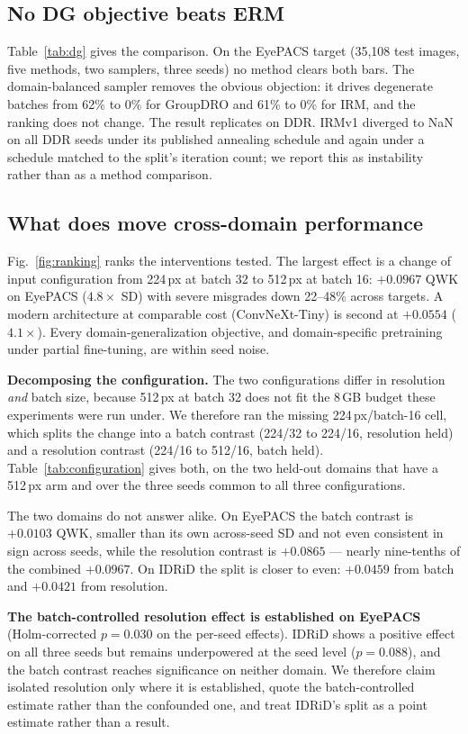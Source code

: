 \documentclass[journal]{IEEEtran}
\begin{document}
\subsection{No DG objective beats ERM}
Table~\ref{tab:dg} gives the comparison. On the EyePACS target
(35{,}108 test images, five methods, two samplers, three seeds) no method
clears both bars. The domain-balanced sampler removes the
obvious objection: it drives degenerate batches from 62\% to 0\% for GroupDRO
and 61\% to 0\% for IRM, and the ranking does not change. The result replicates
on DDR. IRMv1 diverged to NaN on all DDR seeds under its published annealing
schedule and again under a schedule matched to the split's iteration count;
we report this as instability rather than as a method comparison.

\subsection{What does move cross-domain performance}
\label{sec:resolution}
Fig.~\ref{fig:ranking} ranks the interventions tested. The largest effect is a
change of input configuration from 224\,px at batch 32 to 512\,px at batch 16:
$+0.0967$ QWK on EyePACS ($4.8\times$ SD) with severe misgrades down 22--48\%
across targets. A modern architecture at comparable cost (ConvNeXt-Tiny) is
second at $+0.0554$ ($4.1\times$). Every domain-generalization objective, and
domain-specific pretraining under partial fine-tuning, are within seed noise.

\textbf{Decomposing the configuration.} The two configurations differ in
resolution \emph{and} batch size, because 512\,px at batch 32 does not fit the
8\,GB budget these experiments were run under. We therefore ran the missing
224\,px/batch-16 cell, which splits the change into a batch contrast
(224/32 to 224/16, resolution held) and a resolution contrast
(224/16 to 512/16, batch held). Table~\ref{tab:configuration} gives both, on
the two held-out domains that have a 512\,px arm and over the three seeds
common to all three configurations.

The two domains do not answer alike. On EyePACS the batch contrast is
$+0.0103$ QWK, smaller than its own across-seed SD and not even consistent in
sign across seeds, while the resolution contrast is $+0.0865$ --- nearly
nine-tenths of the combined $+0.0967$. On IDRiD the split is closer to even:
$+0.0459$ from batch and $+0.0421$ from resolution.

\textbf{The batch-controlled resolution effect is established on EyePACS}
(Holm-corrected $p=0.030$ on the per-seed effects). IDRiD shows a positive
effect on all three seeds but remains underpowered at the seed level
($p=0.088$), and the batch contrast reaches significance on neither domain.
We therefore claim isolated resolution only where it is established, quote the
batch-controlled estimate rather than the confounded one, and treat IDRiD's
split as a point estimate rather than a result.
\end{document}
